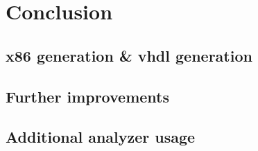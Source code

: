 \chapter{Conclusion}\label{sec:conclusion}

\section{x86 generation \& vhdl generation}

\section{Further improvements}

\section{Additional analyzer usage}